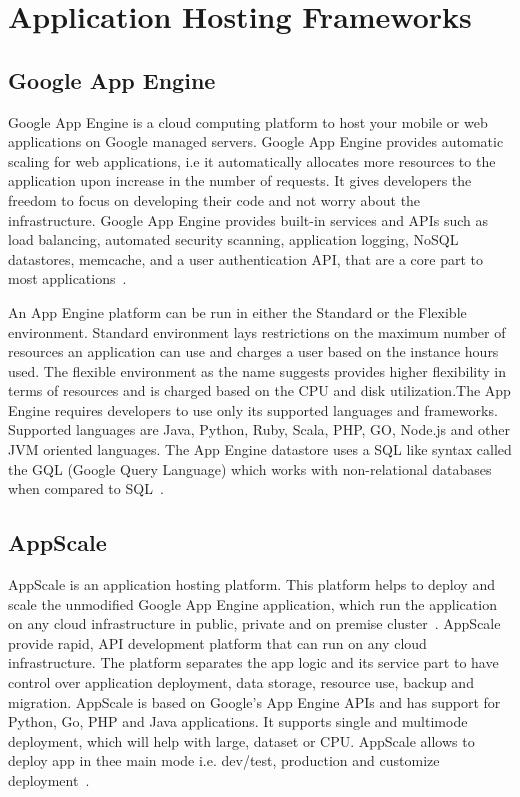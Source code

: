 \section{Application Hosting Frameworks}

\subsection{Google App Engine}

Google App Engine is a cloud computing platform to host your mobile or
web applications on Google managed servers. Google App Engine provides
automatic scaling for web applications, i.e it automatically allocates
more resources to the application upon increase in the number of
requests. It gives developers the freedom to focus on developing their
code and not worry about the infrastructure. Google App Engine
provides built-in services and APIs such as load balancing, automated
security scanning, application logging, NoSQL datastores, memcache,
and a user authentication API, that are a core part to most
applications~\cite{www-appengine-google}.
     
An App Engine platform can be run in either the Standard or the
Flexible environment. Standard environment lays restrictions on the
maximum number of resources an application can use and charges a user
based on the instance hours used. The flexible environment as the name
suggests provides higher flexibility in terms of resources and is
charged based on the CPU and disk utilization.The App Engine requires
developers to use only its supported languages and
frameworks. Supported languages are Java, Python, Ruby, Scala, PHP,
GO, Node.js and other JVM oriented languages. The App Engine datastore
uses a SQL like syntax called the GQL (Google Query Language) which
works with non-relational databases when compared to
SQL~\cite{www-wiki-appengine}.
    
\subsection{AppScale}

AppScale is an application hosting platform. This platform helps to
deploy and scale the unmodified Google App Engine application, which
run the application on any cloud infrastructure in public, private and
on premise cluster~\cite{www-appscale}. AppScale provide rapid, API
development platform that can run on any cloud infrastructure. The
platform separates the app logic and its service part to have control
over application deployment, data storage, resource use, backup and
migration.  AppScale is based on Google's App Engine APIs and has
support for Python, Go, PHP and Java applications. It supports single
and multimode deployment, which will help with large, dataset or
CPU. AppScale allows to deploy app in thee main mode i.e. dev/test,
production and customize deployment~\cite{www-appscale-deployment}.

